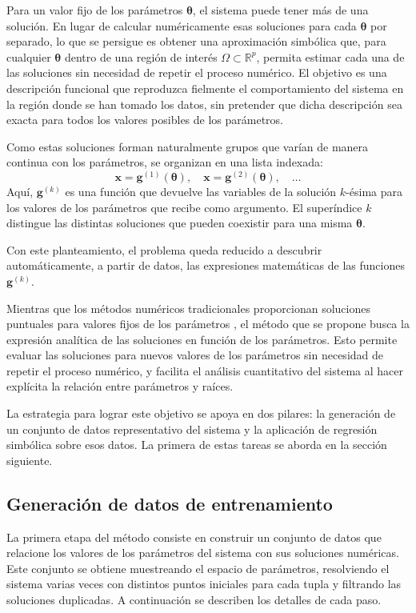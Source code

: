 \documentclass{article} \usepackage[utf8]{inputenc} \usepackage[spanish]{babel} \spanishdecimal{.} \usepackage{amsmath, amssymb, amsthm} \usepackage{bm} \usepackage{float} \usepackage{longtable} \usepackage[hidelinks]{hyperref}
\newcommand{\xvec}{\mathbf{x}} \newcommand{\thetavec}{\boldsymbol{\theta}} \newcommand{\Fvec}{\mathbf{F}} \newcommand{\R}{\mathbb{R}} \newcommand{\norm}[1]{\left\lVert#1\right\rVert} \newcommand{\loss}{\mathcal{L}} \newcommand{\dataset}{\mathcal{D}} \newcommand{\jac}{\mathbf{J}}
\begin{document}
Para un valor fijo de los parámetros \(\thetavec\), el sistema puede
tener más de una solución. En lugar de calcular numéricamente esas
soluciones para cada \(\thetavec\) por separado, lo que se persigue es
obtener una aproximación simbólica que, para cualquier \(\thetavec\)
dentro de una región de interés \(\Omega \subset \R^p\), permita
estimar cada una de las soluciones sin necesidad de repetir el proceso
numérico. El objetivo es una descripción funcional que reproduzca
fielmente el comportamiento del sistema en la región donde se han
tomado los datos, sin pretender que dicha descripción sea exacta para
todos los valores posibles de los parámetros.

Como estas soluciones forman naturalmente grupos que varían de manera
continua con los parámetros, se organizan en una lista indexada:
\[
\xvec = \mathbf{g}^{(1)}(\thetavec),\quad
\xvec = \mathbf{g}^{(2)}(\thetavec),\quad \dots
\]
Aquí, \(\mathbf{g}^{(k)}\) es una función que devuelve las variables de
la solución \(k\)-ésima para los valores de los parámetros que recibe
como argumento. El superíndice \(k\) distingue las distintas soluciones
que pueden coexistir para una misma \(\thetavec\).

Con este planteamiento, el problema queda reducido a descubrir
automáticamente, a partir de datos, las expresiones matemáticas de las
funciones \(\mathbf{g}^{(k)}\).

Mientras que los métodos numéricos tradicionales proporcionan
soluciones puntuales para valores fijos de los parámetros
\cite{burden2010numerical}, el método que se propone busca la
expresión analítica de las soluciones en función de los parámetros.
Esto permite evaluar las soluciones para nuevos valores de los
parámetros sin necesidad de repetir el proceso numérico, y facilita el
análisis cuantitativo del sistema al hacer explícita la relación entre
parámetros y raíces.

La estrategia para lograr este objetivo se apoya en dos pilares: la
generación de un conjunto de datos representativo del sistema y la
aplicación de regresión simbólica sobre esos datos. La primera de estas
tareas se aborda en la sección siguiente.

\subsection{Generación de datos de entrenamiento}
\label{sec:generacion_datos}

La primera etapa del método consiste en construir un conjunto de datos
que relacione los valores de los parámetros del sistema con sus
soluciones numéricas. Este conjunto se obtiene muestreando el espacio
de parámetros, resolviendo el sistema varias veces con distintos puntos
iniciales para cada tupla y filtrando las soluciones duplicadas. A
continuación se describen los detalles de cada paso.
\end{document}
